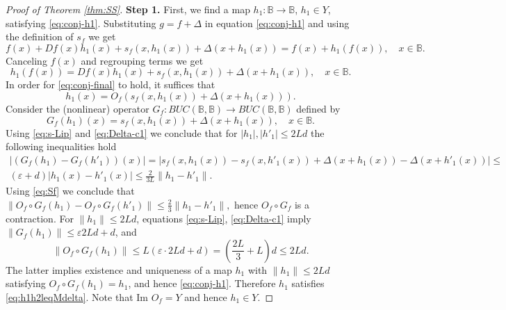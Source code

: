 \documentclass[12pt]{article}
\newcommand{\Bb}{\mathbb{B}}
\theoremstyle{definition}
\begin{document}
\begin{proof}[Proof of Theorem \ref{thm:SS}]
\textbf{Step 1.} First, we find a map $h_1: \Bb \to \Bb$, $h_1 \in Y$, satisfying \eqref{eq:conj-h1}.
Substituting $g = f + \Delta$ in equation \eqref{eq:conj-h1} and using the definition of $s_f$ we get
    $$
    f(x) + Df(x)h_1(x) + s_f(x, h_1(x)) + \Delta(x+h_1(x)) = f(x) + h_1(f(x)), \quad x \in \Bb.
    $$
    Canceling $f(x)$ and regrouping terms we get
\begin{equation}\label{eq:conj-final}
        h_1(f(x)) = Df(x)h_1(x) + s_f(x, h_1(x)) + \Delta(x+h_1(x)), \quad x \in \Bb.    
\end{equation}
In order for \eqref{eq:conj-final} to hold, it suffices that
\begin{equation}
    h_1(x) = O_f(s_f(x, h_1(x)) + \Delta(x+h_1(x))).
\end{equation}    
Consider the (nonlinear) operator $G_f:BUC(\Bb, \Bb) \to BUC(\Bb, \Bb)$ defined by
$$
G_f(h_1)(x) = s_f(x, h_1(x)) + \Delta(x+h_1(x)), \quad x \in \Bb.
$$
Using \eqref{eq:s-Lip} and \eqref{eq:Delta-c1} we conclude that for $|h_1|, |h'_1| \leq 2L d$ the following inequalities hold 
\begin{multline*}
|(G_f(h_1)-G_f(h'_1))(x)| = |s_f(x, h_1(x)) - s_f(x, h'_1(x)) + \Delta(x+h_1(x)) - \Delta(x+h'_1(x))| \leq \\
(\varepsilon+d)|h_1(x) - h'_1(x)| \leq \frac{2}{3L}\|h_1 - h'_1\|.
\end{multline*}
Using \eqref{eq:Sf} we conclude that 
$
\|O_f \circ G_f(h_1) - O_f \circ G_f(h'_1)\| \leq \frac{2}{3}\|h_1-h'_1\|,
$
hence $O_f \circ G_f$ is a contraction. For $\|h_1\| \leq 2Ld$, equations \eqref{eq:s-Lip}, \eqref{eq:Delta-c1} imply $\|G_f(h_1)\| \leq \varepsilon 2Ld + d$, and
$$
\|O_f \circ G_f(h_1)\| \leq L(\varepsilon \cdot 2Ld + d) =  \left(\frac{2L}{3}+L\right)d \leq 2Ld.
$$
The latter implies existence and uniqueness of a map $h_1$ with $\|h_1\| \leq 2Ld$ satisfying $O_f \circ G_f (h_1) = h_1$,
and hence \eqref{eq:conj-h1}.  
Therefore $h_1$ satisfies \eqref{eq:h1h2leqMdelta}. Note that $\mbox{Im }O_f = Y$
and hence $h_1 \in Y$. 


\end{proof}
\end{document}
